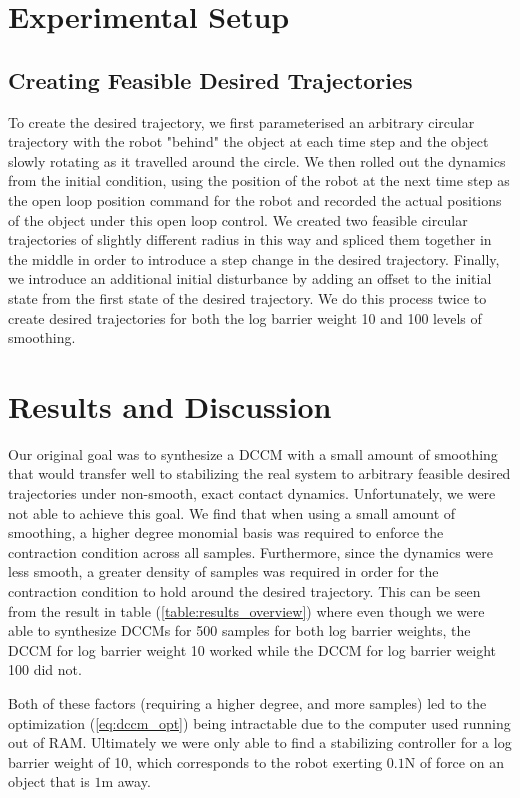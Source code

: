 \documentclass[journal]{IEEEtran}
\begin{document}
\section{Experimental Setup}
\subsection{Creating Feasible Desired Trajectories}
To create the desired trajectory, we first parameterised an arbitrary circular trajectory with the robot "behind" the object at each time step and the object slowly rotating as it travelled around the circle. We then rolled out the dynamics from the initial condition, using the position of the robot at the next time step as the open loop position command for the robot and recorded the actual positions of the object under this open loop control. We created two feasible circular trajectories of slightly different radius in this way and spliced them together in the middle in order to introduce a step change in the desired trajectory. Finally, we introduce an additional initial disturbance by adding an offset to the initial state from the first state of the desired trajectory. We do this process twice to create desired trajectories for both the log barrier weight 10 and 100 levels of smoothing.

\section{Results and Discussion}
Our original goal was to synthesize a DCCM with a small amount of smoothing that would transfer well to stabilizing the real system to arbitrary feasible desired trajectories under non-smooth, exact contact dynamics. Unfortunately, we were not able to achieve this goal. We find that when using a small amount of smoothing, a higher degree monomial basis was required to enforce the contraction condition across all samples. Furthermore, since the dynamics were less smooth, a greater density of samples was required in order for the contraction condition to hold around the desired trajectory. This can be seen from the result in table (\ref{table:results_overview}) where even though we were able to synthesize DCCMs for 500 samples for both log barrier weights, the DCCM for log barrier weight 10 worked while the DCCM for log barrier weight 100 did not.

Both of these factors (requiring a higher degree, and more samples) led to the optimization (\ref{eq:dccm_opt}) being intractable due to the computer used running out of RAM. Ultimately we were only able to find a stabilizing controller for a log barrier weight of 10, which corresponds to the robot exerting $0.1$N of force on an object that is $1$m away.
\end{document}
